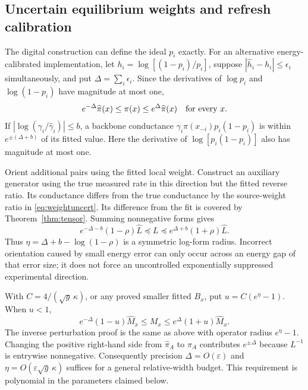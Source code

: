 \documentclass[10pt,a4paper]{article}
\theoremstyle{definition}\newtheorem{assumption}[theorem]{Assumption}
\newcommand{\eps}{\varepsilon}
\begin{document}
\subsection{Uncertain equilibrium weights and refresh calibration}

The digital construction can define the ideal $p_i$ exactly. For an alternative energy-calibrated implementation, let $h_i=\log[(1-p_i)/p_i]$, suppose $|\widehat h_i-h_i|\le\epsilon_i$ simultaneously, and put $\Delta=\sum_i\epsilon_i$. Since the derivatives of $\log p_i$ and $\log(1-p_i)$ have magnitude at most one,
\begin{equation}
 e^{-\Delta}\widehat\pi(x)\le\pi(x)\le e^\Delta\widehat\pi(x)
 \quad\hbox{for every }x.
 \label{eq:weightuncert}
\end{equation}
If $|\log(\gamma_i/\widehat\gamma_i)|\le b$, a backbone conductance
$\gamma_i\pi(x_{-i})p_i(1-p_i)$ is within $e^{\pm(\Delta+b)}$ of its fitted value. Here the derivative of $\log[p_i(1-p_i)]$ also has magnitude at most one.

Orient additional pairs using the fitted local weight. Construct an auxiliary generator using the true measured rate in this direction but the fitted reverse ratio. Its conductance differs from the true conductance by the source-weight ratio in \eqref{eq:weightuncert}. Its difference from the fit is covered by Theorem~\ref{thm:tensor}. Summing nonnegative forms gives
\begin{equation}
 e^{-\Delta-b}(1-\rho)\widehat L\preceq L
 \preceq e^{\Delta+b}(1+\rho)\widehat L.
 \label{eq:energyform}
\end{equation}
Thus $\eta=\Delta+b-\log(1-\rho)$ is a symmetric log-form radius. Incorrect orientation caused by small energy error can only occur across an energy gap of that error size; it does not force an uncontrolled exponentially suppressed experimental direction.

With $C=4/(\sqrt g\,\kappa)$, or any proved smaller fitted $B_x$, put $u=C(e^\eta-1)$. When $u<1$,
\begin{equation}
 e^{-\Delta}(1-u)\widehat M_x
 \le M_x\le e^\Delta(1+u)\widehat M_x.
 \label{eq:energymean}
\end{equation}
The inverse perturbation proof is the same as above with operator radius $e^\eta-1$. Changing the positive right-hand side from $\widehat\pi_A$ to $\pi_A$ contributes $e^{\pm\Delta}$ because $L^{-1}$ is entrywise nonnegative. Consequently precision $\Delta=O(\eps)$ and $\eta=O(\eps\sqrt g\,\kappa)$ suffices for a general relative-width budget. This requirement is polynomial in the parameters claimed below.
\end{document}

